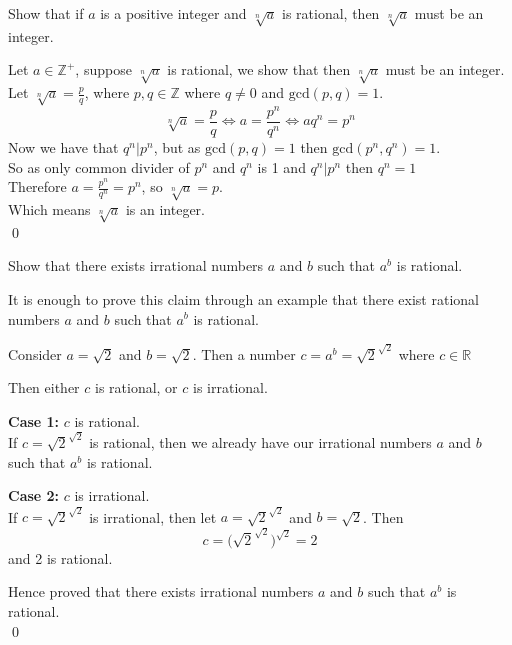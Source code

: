 \documentclass[12pt]{exam}
\begin{document}
\begin{questions}
    \question Show that if $a$ is a positive integer and $\sqrt[n]{a}$ is rational, then $\sqrt[n]{a}$ must be an integer.
    \begin{solution}
        Let $a \in \mathbb{Z}^+$, suppose $\sqrt[n]{a}$ is rational, we show that then $\sqrt[n]{a}$ must be an integer.
        \\Let $\sqrt[n]{a} = \frac{p}{q}$, where $p,q \in \mathbb{Z}$ where $q \neq 0$ and $\text{gcd}(p,q) = 1$.
        $$\sqrt[n]{a} = \frac{p}{q} \Leftrightarrow a = \frac{p^n}{q^n} \Leftrightarrow a q^n = p^n$$
        Now we have that $q^n | p^n$, but as $\text{gcd}(p,q) = 1$ then $\text{gcd}(p^n,q^n) = 1$.
        \\So as only common divider of $p^n$ and $q^n$ is 1 and $q^n | p^n$ then $q^n = 1$
        \\Therefore $ a = \frac{p^n}{q^n} = p^n$, so $\sqrt[n]{a} = p$.
        \\Which means $\sqrt[n]{a}$ is an integer.
        \\\qed
    \end{solution}

    \question Show that there exists irrational numbers $a$ and $b$ such that $a^b$ is rational.
    \begin{solution}
        It is enough to prove this claim through an example that there exist rational numbers $a$ and $b$ such that $a^b$ is rational. 

        Consider $a = \sqrt{2}$ and $ b = \sqrt{2} $. Then a number $ c = a^b = \sqrt{2}^{\sqrt{2}} $ where $ c \in \mathbb{R} $

        Then either $ c $ is rational, or $c$ is irrational. 

        \textbf{Case 1:} $c$ is rational. \\ 
        If $ c = \sqrt{2}^{\sqrt{2}} $ is rational, then we already have our irrational numbers $a$ and $b$ such that $ a^b $ is rational.
            
        \textbf{Case 2:} $c$ is irrational. \\ 
        If $c = \sqrt{2}^{\sqrt{2}} $ is irrational, then let $ a = \sqrt{2}^{\sqrt{2}} $ and $ b = \sqrt{2} $. Then $$ c = \biggl( \sqrt{2}^{\sqrt{2}} \biggr)^{\sqrt{2}} = 2$$
        and 2 is rational.

        Hence proved that there exists irrational numbers $a$ and $b$ such that $ a^b $ is rational.
        \\\qed
    \end{solution}


\end{questions}
\end{document}
